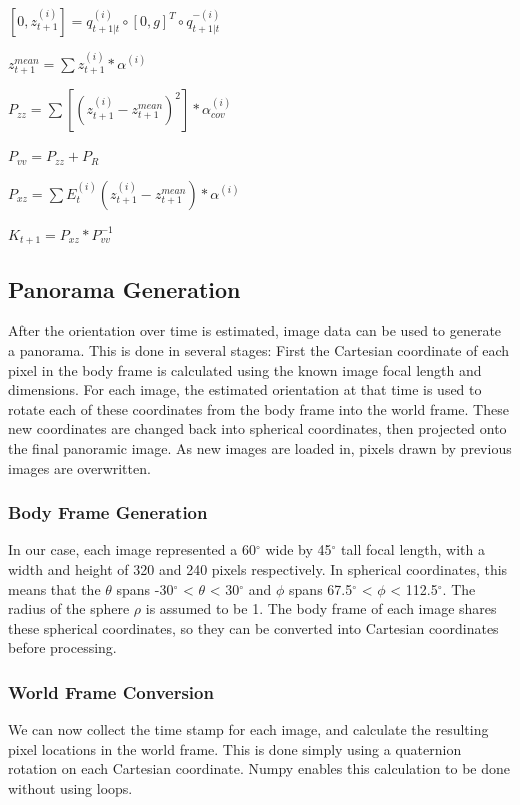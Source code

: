 \documentclass[a4paper]{article}
\begin{document}
$[0,z_{t+1}^{(i)}] = q_{t+1|t}^{(i)} \circ [0,g]^T \circ q_{t+1|t}^{-(i)}$

$z_{t+1}^{mean} = \sum{z_{t+1}^{(i)} * \alpha ^{(i)}}$

$P_{zz} = \sum{ [( z_{t+1}^{(i)} - z_{t+1}^{mean})^2] * \alpha_{cov}^{(i)}}$

$P_{vv} = P_{zz} + P_R$

$P_{xz} = \sum{E_t^{(i)}( z_{t+1}^{(i)} - z_{t+1}^{mean}) * \alpha ^{(i)}}$

$K_{t+1} = P_{xz} * P_{vv}^{-1}$

\subsection{Panorama Generation}

After the orientation over time is estimated, image data can be used to generate a panorama. This is done in several stages: First the Cartesian coordinate of each pixel in the body frame is calculated using the known image focal length and dimensions. For each image, the estimated orientation at that time is used to rotate each of these coordinates from the body frame into the world frame. These new coordinates are changed back into spherical coordinates, then projected onto the final panoramic image. As new images are loaded in, pixels drawn by previous images are overwritten.

\subsubsection{Body Frame Generation}

In our case, each image represented a 60$^{\circ}$ wide by 45$^{\circ}$ tall focal length, with a width and height of 320 and 240 pixels respectively. In spherical coordinates, this means that the $\theta$ spans -30$^{\circ}$ < $\theta$ < 30$^{\circ}$ and $\phi$ spans 67.5$^{\circ}$ < $\phi$ <  112.5$^{\circ}$. The radius of the sphere $\rho$ is assumed to be 1. The body frame of each image shares these spherical coordinates, so they can be converted into Cartesian coordinates before processing.

\subsubsection{World Frame Conversion}

We can now collect the time stamp for each image, and calculate the resulting pixel locations in the world frame. This is done simply using a quaternion rotation on each Cartesian coordinate. Numpy enables this calculation to be done without using loops.
\end{document}
